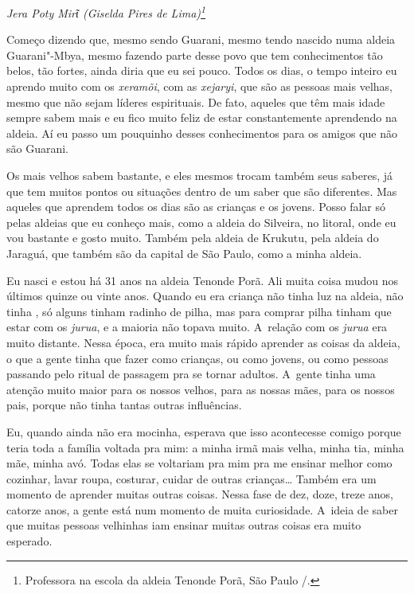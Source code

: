 
\begin{flushright}
\emph{Jera Poty Mirῖ (Giselda Pires de Lima)\footnote{Professora na escola da aldeia Tenonde Porã, São Paulo /.}}
\end{flushright}  

\noindent
Começo dizendo que, mesmo sendo Guarani, mesmo tendo nascido numa aldeia
Guarani"-Mbya, mesmo fazendo parte desse povo que tem conhecimentos tão
belos, tão fortes, ainda diria que eu sei pouco. Todos os dias, o tempo
inteiro eu aprendo muito com os \emph{xeramõi}, com as \emph{xejaryi}, que são as
pessoas mais velhas, mesmo que não sejam líderes espirituais. De fato,
aqueles que têm mais idade sempre sabem mais e eu fico muito feliz de
estar constantemente aprendendo na aldeia. Aí eu passo um pouquinho
desses conhecimentos para os amigos que não são Guarani.

Os mais velhos sabem bastante, e eles mesmos trocam também seus saberes,
já que tem muitos pontos ou situações dentro de um saber que são
diferentes. Mas aqueles que aprendem todos os dias são as crianças e os
jovens. Posso falar só pelas aldeias que eu conheço mais, como a aldeia
do Silveira, no litoral, onde eu vou bastante e gosto muito. Também
pela aldeia de Krukutu, pela aldeia do Jaraguá, que também são da
capital de São Paulo, como a minha aldeia.

Eu nasci e estou há 31 anos na aldeia Tenonde Porã. Ali muita coisa
mudou nos últimos quinze ou vinte anos. Quando eu era criança não tinha
luz na aldeia, não tinha , só alguns tinham radinho de pilha, mas
para comprar pilha tinham que estar com os \emph{jurua}, e a maioria não
topava muito. A~relação com os \emph{jurua} era muito distante. Nessa época,
era muito mais rápido aprender as coisas da aldeia, o que a gente tinha
que fazer como crianças, ou como jovens, ou como pessoas passando pelo
ritual de passagem pra se tornar adultos. A~gente tinha uma atenção
muito maior para os nossos velhos, para as nossas mães, para os nossos
pais, porque não tinha tantas outras influências.

Eu, quando ainda não era mocinha, esperava que isso acontecesse comigo
porque teria toda a família voltada pra mim: a minha irmã mais velha,
minha tia, minha mãe, minha avó. Todas elas se voltariam pra mim pra me
ensinar melhor como cozinhar, lavar roupa, costurar, cuidar de outras
crianças\ldots{} Também era um momento de aprender muitas outras coisas.
Nessa fase de dez, doze, treze anos, catorze anos, a gente está num
momento de muita curiosidade. A~ideia de saber que muitas pessoas
velhinhas iam ensinar muitas outras coisas era muito esperado.

